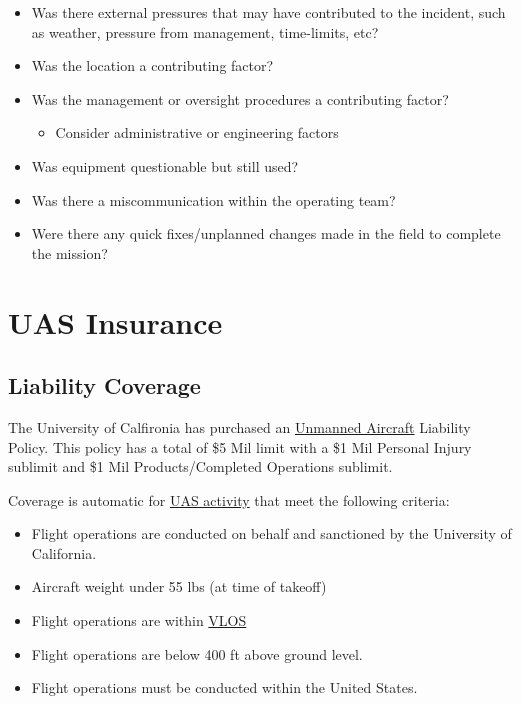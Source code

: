 \documentclass[
]{book}
\providecommand{\tightlist}{%
  \setlength{\itemsep}{0pt}\setlength{\parskip}{0pt}}
\begin{document}
\begin{itemize}
\item
  Was there external pressures that may have contributed to the incident, such as weather, pressure from management, time-limits, etc?
\item
  Was the location a contributing factor?
\item
  Was the management or oversight procedures a contributing factor?

  \begin{itemize}
  \tightlist
  \item
    Consider administrative or engineering factors
  \end{itemize}
\item
  Was equipment questionable but still used?
\item
  Was there a miscommunication within the operating team?
\item
  Were there any quick fixes/unplanned changes made in the field to complete the mission?
\end{itemize}

\hypertarget{ch-insurance}{%
\chapter{UAS Insurance}\label{ch-insurance}}

\hypertarget{s-UC-liability}{%
\section{Liability Coverage}\label{s-UC-liability}}

The University of Calfironia has purchased an \protect\hyperlink{UA}{Unmanned Aircraft} Liability Policy. This policy has a total of \$5 Mil limit with a \$1 Mil Personal Injury sublimit and \$1 Mil Products/Completed Operations sublimit.

Coverage is automatic for \protect\hyperlink{UASactivity}{UAS activity} that meet the following criteria:

\begin{itemize}
\tightlist
\item
  Flight operations are conducted on behalf and sanctioned by the University of California.
\item
  Aircraft weight under 55 lbs (at time of takeoff)
\item
  Flight operations are within \protect\hyperlink{VLOS}{VLOS}
\item
  Flight operations are below 400 ft above ground level.
\item
  Flight operations must be conducted within the United States.
\end{itemize}
\end{document}
